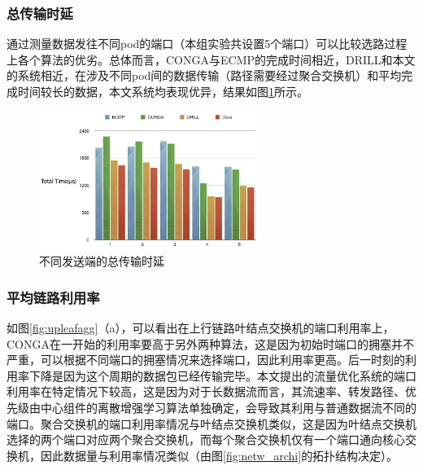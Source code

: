 \subsubsection{总传输时延}
通过测量数据发往不同pod的端口（本组实验共设置5个端口）可以比较选路过程上各个算法的优劣。总体而言，CONGA与ECMP的完成时间相近，DRILL和本文的系统相近，在涉及不同pod间的数据传输（路径需要经过聚合交换机）和平均完成时间较长的数据，本文系统均表现优异，结果如图\ref{fig:total_time}所示。
\begin{figure}[ht]
\centering
\includegraphics[height=4.5cm]{figure/totla_time.png}
\caption{不同发送端的总传输时延}
\label{fig:total_time}
\end{figure}


\subsubsection{平均链路利用率}

如图\ref{fig:upleafagg}（a），可以看出在上行链路叶结点交换机的端口利用率上，CONGA在一开始的利用率要高于另外两种算法，这是因为初始时端口的拥塞并不严重，可以根据不同端口的拥塞情况来选择端口，因此利用率更高。后一时刻的利用率下降是因为这个周期的数据包已经传输完毕。本文提出的流量优化系统的端口利用率在特定情况下较高，这是因为对于长数据流而言，其流速率、转发路径、优先级由中心组件的离散增强学习算法单独确定，会导致其利用与普通数据流不同的端口。聚合交换机的端口利用率情况与叶结点交换机类似，这是因为叶结点交换机选择的两个端口对应两个聚合交换机，而每个聚合交换机仅有一个端口通向核心交换机，因此数据量与利用率情况类似（由图\ref{fig:netw_archi}的拓扑结构决定）。

